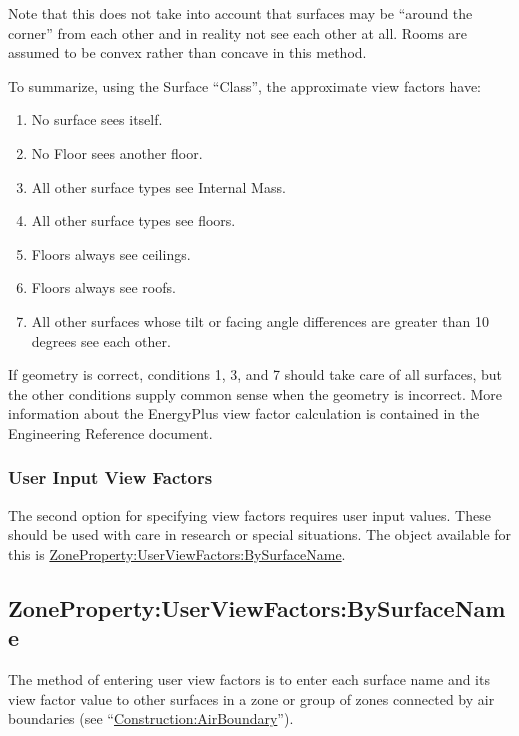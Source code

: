 Note that this does not take into account that surfaces may be ``around the corner'' from each other and in reality not see each other at all. Rooms are assumed to be convex rather than concave in this method.

To summarize, using the Surface ``Class'', the approximate view factors have:

\begin{enumerate}
  \item
    No surface sees itself.
  \item
    No Floor sees another floor.
  \item
    All other surface types see Internal Mass.
  \item
    All other surface types see floors.
  \item
    Floors always see ceilings.
  \item
    Floors always see roofs.
  \item
    All other surfaces whose tilt or facing angle differences are greater than 10 degrees see each other.
\end{enumerate}

If geometry is correct, conditions 1, 3, and 7 should take care of all surfaces, but the other conditions supply common sense when the geometry is incorrect. More information about the EnergyPlus view factor calculation is contained in the Engineering Reference document.

\subsubsection{User Input View Factors}\label{user-input-view-factors}

The second option for specifying view factors requires user input values. These should be used with care in research or special situations. The object available for this is \hyperref[zonepropertyuserviewfactorsbysurfacename]{ZoneProperty:UserViewFactors:BySurfaceName}.

\subsection{ZoneProperty:UserViewFactors:BySurfaceName}\label{zonepropertyuserviewfactorsbysurfacename}

The method of entering user view factors is to enter each surface name and its view factor value to other
surfaces in a zone or group of zones connected by air boundaries (see ``\hyperref[constructionairboundary]{Construction:AirBoundary}'').

